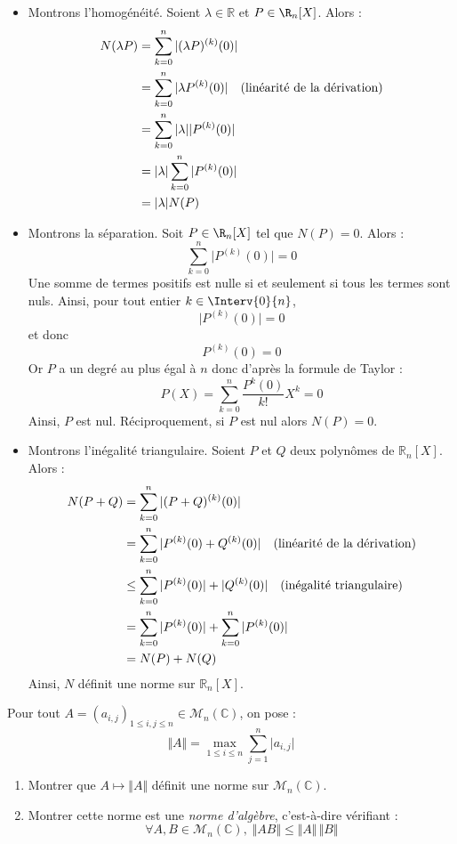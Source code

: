 \documentclass[a4paper,10pt]{report}
\begin{document}
\begin{itemize}
\item Montrons l'homogénéité. Soient $\lambda \in \mathbb{R}$ et $P \in  \R_n[X ]$. Alors :
\begin{align*}
N(\lambda P) & =  \sum_{k = 0}^{ n } \vert (\lambda P)^{(k)} (0) \vert  \\
& =  \sum_{k = 0}^{ n }  \vert \lambda P^{(k)} (0) \vert \quad \hbox{(linéarité de la dérivation)} \\
& =  \sum_{k = 0}^{ n } \vert \lambda \vert \vert P^{(k)} (0) \vert \\
& = \vert \lambda \vert \sum_{k = 0}^{ n } \vert P^{(k)} (0) \vert \\
& = \vert \lambda \vert N(P) 
\end{align*}
\item Montrons la séparation. Soit $P \in  \R_n[X ]$ tel que $N(P)=0$. Alors :  
$$ \sum_{k = 0}^{ n } \vert P^{(k)} (0) \vert =0$$
Une somme de termes positifs est nulle si et seulement si tous les termes sont nuls. Ainsi, pour tout entier $k \in \Interv{0}{n}$,
$$  \vert P^{(k)} (0) \vert = 0$$
et donc 
$$   P^{(k)} (0)  = 0$$
Or $P$ a un degré au plus égal à $n$ donc d'après la formule de Taylor :
$$ P(X) = \sum_{k=0}^n \dfrac{P^{k}(0)}{k!} X^k = 0$$
Ainsi, $P$ est nul. Réciproquement, si $P$ est nul alors $N(P)=0$.
\item Montrons l'inégalité triangulaire. Soient $P$ et $Q$ deux polynômes de $\mathbb{R}_n[X]$. Alors :
\begin{align*}
N(P+Q) & = \sum_{k = 0}^{ n } \vert (P+Q)^{(k)} (0) \vert \\
& = \sum_{k = 0}^{ n } \vert P^{(k)} (0) +  Q^{(k)} (0) \vert \quad \hbox{(linéarité de la dérivation)} \\
& \leq \sum_{k = 0}^{ n } \vert P^{(k)} (0) \vert +  \vert Q^{(k)} (0) \vert \quad \hbox{(inégalité triangulaire)} \\
& = \sum_{k = 0}^{ n } \vert P^{(k)} (0) \vert + \sum_{k = 0}^{ n } \vert P^{(k)} (0) \vert \\
& = N(P) + N(Q)
\end{align*}
Ainsi, $N$ définit une norme sur $\mathbb{R}_n[X]$.
\end{itemize}


\begin{Exercice}{} Pour tout $A = (a_{i,j})_{1 \leq i,j \leq n} \in \mathcal{M}_{n}(\mathbb{C})$, on pose :
  \[
  \Vert A \Vert = \max_{1 \leq i \leq n} \sum_{j = 1}^{n}  \vert a_{i,j} \vert
  \]
  \begin{enumerate}
  \item Montrer que $A \mapsto \Vert A \Vert$ définit une norme sur $\mathcal{M}_{n}(\mathbb{C})$.
  \item Montrer cette norme est une \textit{norme d'algèbre}, c'est-à-dire vérifiant :
    \[
    \forall A,B \in \mathcal{M}_{n}(\mathbb{C}),  \; \Vert AB \Vert \leq \Vert A \Vert \, \Vert B \Vert
    \]
  \end{enumerate}
\end{Exercice}
\end{document}
